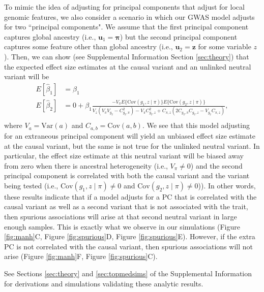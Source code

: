 \documentclass[12pt]{article}
\begin{document}
To mimic the idea of adjusting for principal components that adjust for local genomic features, we also consider a scenario in which our GWAS model adjusts for two ``principal components".
We assume that the first principal component captures global ancestry (i.e., $\mathbf{u}_1 = \boldsymbol\pi$) but the second principal component captures some feature other than global ancestry (i.e., $\mathbf{u}_2 = \mathbf{z}$ for some variable $z$).
Then, we can show (see Supplemental Information Section \ref{sec:theory}) that the expected effect size estimates at the causal variant and an unlinked neutral variant will be
\begin{equation}
\begin{aligned}
E[\hat\beta_1] & = \beta_1 \\
E[\hat\beta_2] & = 0 + \beta_1 \frac{-V_\pi E\{\text{Cov}(g_1, z \mid \pi)\} E\{\text{Cov}(g_2, z \mid \pi)\}}{V_z(V_\pi V_{g_2} - C_{g_2,\pi}^2) - V_\pi C_{g_2,z}^2 + C_{\pi, z}(2C_{g_2,\pi} C_{g_2,z} - V_{g_2}C_{\pi,z})}, \\
\end{aligned}
\label{eqn:collider}
\end{equation}
where $V_a = \text{Var}(a)$ and $C_{a,b} = \text{Cov}(a,b)$.
We see that this model adjusting for an extraneous principal component will yield an unbiased effect size estimate at the causal variant, but the same is not true for the unlinked neutral variant.
In particular, the effect size estimate at this neutral variant will be biased away from zero when there is  ancestral heterogeneity (i.e., $V_\pi \neq 0$) and the second principal component is correlated with both the causal variant and the variant being tested (i.e., $\text{Cov}(g_1, z \mid \pi) \neq 0$ and $\text{Cov}(g_2, z \mid \pi) \neq 0$)).
In other words, these results indicate that if a model adjusts for a PC that is correlated with the causal variant as well as a second variant that is not associated with the trait, then spurious associations will arise at that second neutral variant in large enough samples.
This is exactly what we observe in our simulations (Figure \ref{fig:manh}C, Figure \ref{fig:spurious}D,  Figure \ref{fig:spurious}E).
However, if the extra PC is not correlated with the causal variant, then spurious associations will not arise (Figure \ref{fig:manh}F, Figure \ref{fig:spurious}C).

% 
See Sections \ref{sec:theory} and \ref{sec:topmedsims} of the Supplemental Information for derivations and simulations validating these analytic results.
\end{document}
